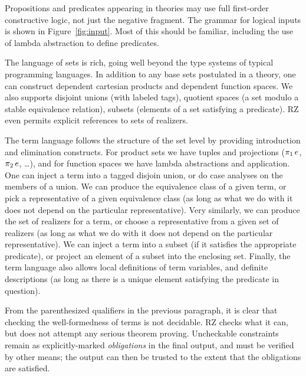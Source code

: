Propositions and predicates appearing in theories may use full
first-order constructive logic, not just the negative fragment. The
grammar for logical inputs is shown in Figure~\ref{fig:input}. Most of
this should be familiar, including the use of lambda abstraction to
define predicates.

The language of sets is rich, going well beyond the type systems of
typical programming languages. In addition to any base sets postulated
in a theory, one can construct dependent cartesian products and
dependent function spaces. We also supports disjoint unions (with
labeled tags), quotient spaces (a set modulo a stable equivalence
relation), subsets (elements of a set satisfying a predicate). RZ even
permits explicit references to sets of realizers.

The term language follows the structure of the set level by providing
introduction and elimination constructs. For product sets we have
tuples and projections ($\mathop{\pi_{1}} e$, $\mathop{\pi_{2}} e$, \ldots),
and for function spaces we have lambda abstractions and application.
One can inject a term into a tagged disjoin union, or do case analyses
on the members of a union. We can produce the equivalence class of a
given term, or pick a representative of a given equivalence class (as
long as what we do with it does not depend on the particular
representative). Very similarly, we can produce the set of realizers
for a term, or choose a representative from a given set of realizers
(as long as what we do with it does not depend on the particular
representative). We can inject a term into a subset (if it satisfies
the appropriate predicate), or project an element of a subset into the
enclosing set. Finally, the term language also allows local
definitions of term variables, and definite descriptions (as long as
there is a unique element satisfying the predicate in question).

From the parenthesized qualifiers in the previous paragraph, it is
clear that checking the well-formedness of terms is not decidable. RZ
checks what it can, but does not attempt any serious theorem proving.
Uncheckable constraints remain as explicitly-marked \emph{obligations}
in the final output, and must be verified by other means; the output
can then be trusted to the extent that the obligations are satisfied.


